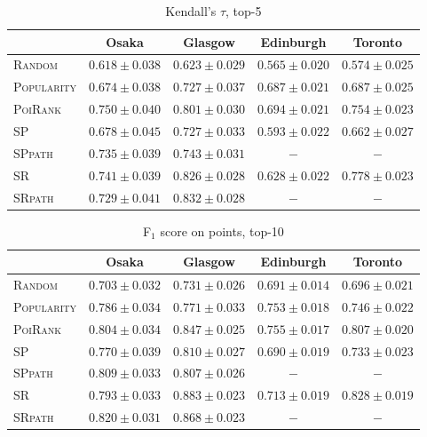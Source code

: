 \begin{table*}[t]
\caption{Kendall's $\tau$, top-5}
\label{tab:tau}
\centering
\begin{tabular}{l|cccc} \hline
 & Osaka & Glasgow & Edinburgh & Toronto \\ \hline
\textsc{Random} & $0.618\pm0.038$ & $0.623\pm0.029$ & $0.565\pm0.020$ & $0.574\pm0.025$ \\
\textsc{Popularity} & $0.674\pm0.038$ & $0.727\pm0.037$ & $\mathit{0.687\pm0.021}$ & $0.687\pm0.025$ \\
\textsc{PoiRank} & $\mathbf{0.750\pm0.040}$ & $0.801\pm0.030$ & $\mathbf{0.694\pm0.021}$ & $\mathit{0.754\pm0.023}$ \\
\textsc{SP} & $0.678\pm0.045$ & $0.727\pm0.033$ & $0.593\pm0.022$ & $0.662\pm0.027$ \\
\textsc{SPpath} & $0.735\pm0.039$ & $0.743\pm0.031$ & $-$ & $-$ \\
\textsc{SR} & $\mathit{0.741\pm0.039}$ & $\mathit{0.826\pm0.028}$ & $0.628\pm0.022$ & $\mathbf{0.778\pm0.023}$ \\
\textsc{SRpath} & $0.729\pm0.041$ & $\mathbf{0.832\pm0.028}$ & $-$ & $-$ \\
\hline
\end{tabular}
\end{table*}


\begin{table*}[t]
\caption{F$_1$ score on points, top-10}
\label{tab:f1}
\centering
\begin{tabular}{l|cccc} \hline
 & Osaka & Glasgow & Edinburgh & Toronto \\ \hline
\textsc{Random} & $0.703\pm0.032$ & $0.731\pm0.026$ & $0.691\pm0.014$ & $0.696\pm0.021$ \\
\textsc{Popularity} & $0.786\pm0.034$ & $0.771\pm0.033$ & $\mathit{0.753\pm0.018}$ & $0.746\pm0.022$ \\
\textsc{PoiRank} & $0.804\pm0.034$ & $0.847\pm0.025$ & $\mathbf{0.755\pm0.017}$ & $\mathit{0.807\pm0.020}$ \\
\textsc{SP} & $0.770\pm0.039$ & $0.810\pm0.027$ & $0.690\pm0.019$ & $0.733\pm0.023$ \\
\textsc{SPpath} & $\mathit{0.809\pm0.033}$ & $0.807\pm0.026$ & $-$ & $-$ \\
\textsc{SR} & $0.793\pm0.033$ & $\mathbf{0.883\pm0.023}$ & $0.713\pm0.019$ & $\mathbf{0.828\pm0.019}$ \\
\textsc{SRpath} & $\mathbf{0.820\pm0.031}$ & $\mathit{0.868\pm0.023}$ & $-$ & $-$ \\
\hline
\end{tabular}
\end{table*}


